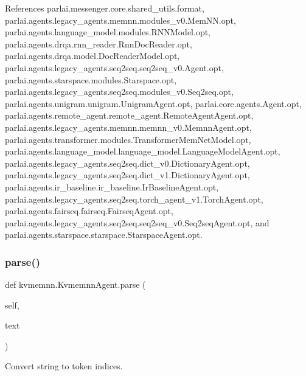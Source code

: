 References parlai.\+messenger.\+core.\+shared\+\_\+utils.\+format, parlai.\+agents.\+legacy\+\_\+agents.\+memnn.\+modules\+\_\+v0.\+Mem\+N\+N.\+opt, parlai.\+agents.\+language\+\_\+model.\+modules.\+R\+N\+N\+Model.\+opt, parlai.\+agents.\+drqa.\+rnn\+\_\+reader.\+Rnn\+Doc\+Reader.\+opt, parlai.\+agents.\+drqa.\+model.\+Doc\+Reader\+Model.\+opt, parlai.\+agents.\+legacy\+\_\+agents.\+seq2seq.\+seq2seq\+\_\+v0.\+Agent.\+opt, parlai.\+agents.\+starspace.\+modules.\+Starspace.\+opt, parlai.\+agents.\+legacy\+\_\+agents.\+seq2seq.\+modules\+\_\+v0.\+Seq2seq.\+opt, parlai.\+agents.\+unigram.\+unigram.\+Unigram\+Agent.\+opt, parlai.\+core.\+agents.\+Agent.\+opt, parlai.\+agents.\+remote\+\_\+agent.\+remote\+\_\+agent.\+Remote\+Agent\+Agent.\+opt, parlai.\+agents.\+legacy\+\_\+agents.\+memnn.\+memnn\+\_\+v0.\+Memnn\+Agent.\+opt, parlai.\+agents.\+transformer.\+modules.\+Transformer\+Mem\+Net\+Model.\+opt, parlai.\+agents.\+language\+\_\+model.\+language\+\_\+model.\+Language\+Model\+Agent.\+opt, parlai.\+agents.\+legacy\+\_\+agents.\+seq2seq.\+dict\+\_\+v0.\+Dictionary\+Agent.\+opt, parlai.\+agents.\+legacy\+\_\+agents.\+seq2seq.\+dict\+\_\+v1.\+Dictionary\+Agent.\+opt, parlai.\+agents.\+ir\+\_\+baseline.\+ir\+\_\+baseline.\+Ir\+Baseline\+Agent.\+opt, parlai.\+agents.\+legacy\+\_\+agents.\+seq2seq.\+torch\+\_\+agent\+\_\+v1.\+Torch\+Agent.\+opt, parlai.\+agents.\+fairseq.\+fairseq.\+Fairseq\+Agent.\+opt, parlai.\+agents.\+legacy\+\_\+agents.\+seq2seq.\+seq2seq\+\_\+v0.\+Seq2seq\+Agent.\+opt, and parlai.\+agents.\+starspace.\+starspace.\+Starspace\+Agent.\+opt.

\mbox{\label{classkvmemnn_1_1KvmemnnAgent_ab29b337013bf1b4f5c33162c84f6528e}} 
\subsubsection{\texorpdfstring{parse()}{parse()}}
{\footnotesize\ttfamily def kvmemnn.\+Kvmemnn\+Agent.\+parse (\begin{DoxyParamCaption}\item[{}]{self,  }\item[{}]{text }\end{DoxyParamCaption})}

\begin{DoxyVerb}Convert string to token indices.\end{DoxyVerb}
 

